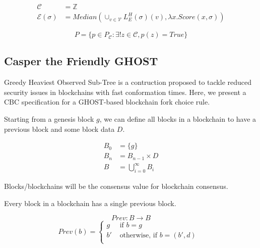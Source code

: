 \begin{defn}
\begin{align*}
\mathcal{C} &= \mathbb{Z} \\
\mathcal{E}(\sigma) &= Median(\cup_{v \in \mathcal{V}} L^H_E(\sigma)(v), \lambda x. Score(x, \sigma))
\end{align*}

\end{defn}

\begin{defn}
$$
P = \{p \in P_{\mathcal{C}} : \exists! z \in \mathcal{C}, p(z) = True\}
$$
\end{defn}



\subsection{Casper the Friendly GHOST}

Greedy Heaviest Observed Sub-Tree\cite{GHOST} is a contruction proposed to tackle reduced security issues in blockchains with fast conformation times. Here, we present a CBC specification for a GHOST-based blockchain fork choice rule.

Starting from a genesis block $g$, we can define all blocks in a blockchain to have a previous block and some block data $D$.

\begin{defn}[Blocks]
\begin{align*}
B_0 &= \{g\} \\
B_n &= B_{n-1} \times D \\
B &= \bigcup_{i = 0}^{\infty} B_i
\end{align*}
\end{defn}

Blocks/blockchains will be the consensus value for blockchain consensus.

Every block in a blockchain has a single previous block.

\begin{defn}
$$
Prev: B \to B
$$
\[ Prev(b) = \begin{cases}
  g  &\text{ if $b = g$ }\\
  b' &\text{ otherwise, if $b = (b', d)$ }\\
   \end{cases}
\]
\end{defn}

